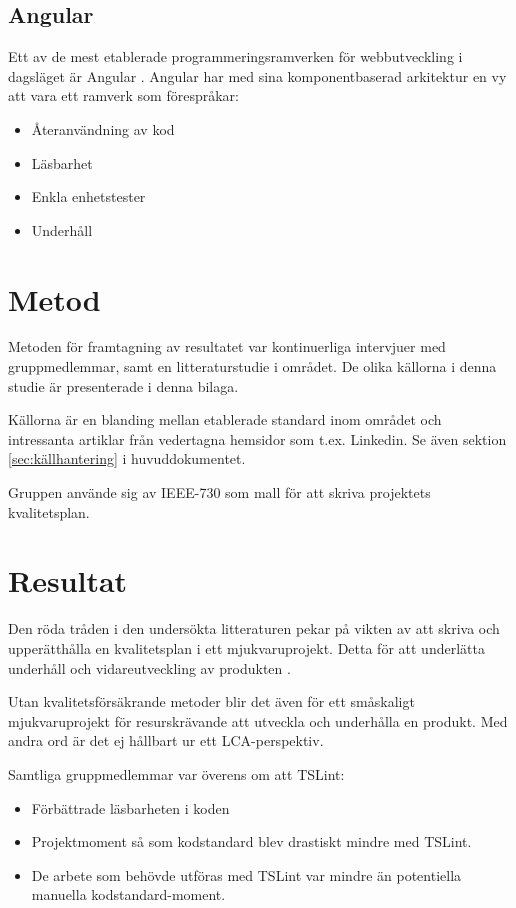 \subsection{Angular}
Ett av de mest etablerade programmeringsramverken för webbutveckling i dagsläget är Angular \cite{altexsoft}. Angular har med sina komponentbaserad arkitektur en vy att vara ett ramverk som förespråkar:

\begin{itemize}
	\item Återanvändning av kod
	\item Läsbarhet
	\item Enkla enhetstester
	\item Underhåll
\end{itemize}

\section{Metod}

Metoden för framtagning av resultatet var kontinuerliga intervjuer med gruppmedlemmar, samt en litteraturstudie i området. De olika källorna i denna studie är presenterade i denna bilaga.

Källorna är en blanding mellan etablerade standard inom området och intressanta artiklar från vedertagna hemsidor som t.ex. Linkedin. Se även sektion \ref{sec:källhantering} i huvuddokumentet.

Gruppen använde sig av IEEE-730 som mall för att skriva projektets kvalitetsplan.

\section{Resultat}

Den röda tråden i den undersökta litteraturen pekar på vikten av att skriva och upperätthålla en kvalitetsplan i ett mjukvaruprojekt. Detta för att underlätta underhåll och vidareutveckling av produkten \cite{sustainable}\cite{altexsoft}\cite{ISOtor}\cite{LCA}. 

Utan kvalitetsförsäkrande metoder blir det även för ett småskaligt mjukvaruprojekt för resurskrävande att utveckla och underhålla en produkt. Med andra ord är det ej hållbart ur ett LCA-perspektiv.

Samtliga gruppmedlemmar var överens om att TSLint:

\begin{itemize}
	\item Förbättrade läsbarheten i koden
	\item Projektmoment så som kodstandard blev drastiskt mindre med TSLint.
	\item De arbete som behövde utföras med TSLint var mindre än potentiella manuella kodstandard-moment.
\end{itemize}

